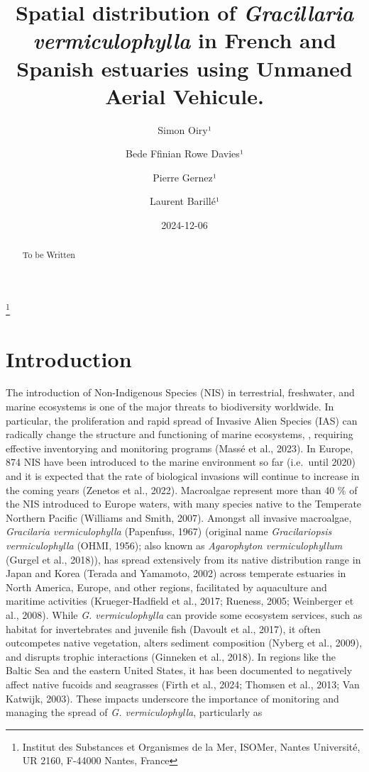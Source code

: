 \documentclass[
  letterpaper,
  DIV=11,
  numbers=noendperiod]{scrartcl}
\title{Spatial distribution of \emph{Gracillaria vermiculophylla} in
French and Spanish estuaries using Unmaned Aerial Vehicule.}
\author{Simon Oiry¹ \and Bede Ffinian Rowe Davies¹ \and Pierre
Gernez¹ \and Laurent Barillé¹}
\date{2024-12-06}
\begin{document}
\maketitle
\begin{abstract}
To be Written
\end{abstract}


\footnote{Institut des Substances et Organismes de la Mer, ISOMer,
  Nantes Université, UR 2160, F-44000 Nantes, France}

\section{Introduction}\label{introduction}

The introduction of Non-Indigenous Species (NIS) in terrestrial,
freshwater, and marine ecosystems is one of the major threats to
biodiversity worldwide. In particular, the proliferation and rapid
spread of Invasive Alien Species (IAS) can radically change the
structure and functioning of marine ecosystems, , requiring effective
inventorying and monitoring programs (Massé et al., 2023). In Europe,
874 NIS have been introduced to the marine environment so far
(i.e.~until 2020) and it is expected that the rate of biological
invasions will continue to increase in the coming years (Zenetos et al.,
2022). Macroalgae represent more than 40 \% of the NIS introduced to
Europe waters, with many species native to the Temperate Northern
Pacific (Williams and Smith, 2007). Amongst all invasive macroalgae,
\emph{Gracilaria vermiculophylla} (Papenfuss, 1967) (original name
\emph{Gracilariopsis vermiculophylla} (OHMI, 1956); also known as
\emph{Agarophyton vermiculophyllum} (Gurgel et al., 2018)), has spread
extensively from its native distribution range in Japan and Korea
(Terada and Yamamoto, 2002) across temperate estuaries in North America,
Europe, and other regions, facilitated by aquaculture and maritime
activities (Krueger-Hadfield et al., 2017; Rueness, 2005; Weinberger et
al., 2008). While \emph{G. vermiculophylla} can provide some ecosystem
services, such as habitat for invertebrates and juvenile fish (Davoult
et al., 2017), it often outcompetes native vegetation, alters sediment
composition (Nyberg et al., 2009), and disrupts trophic interactions
(Ginneken et al., 2018). In regions like the Baltic Sea and the eastern
United States, it has been documented to negatively affect native
fucoids and seagrasses (Firth et al., 2024; Thomsen et al., 2013; Van
Katwijk, 2003). These impacts underscore the importance of monitoring
and managing the spread of \emph{G. vermiculophylla}, particularly as
\end{document}
